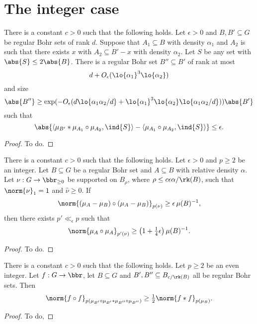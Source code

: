 \chapter{The integer case}

\begin{theorem}\label{th-ap-int}
There is a constant $c>0$ such that the following holds. Let $\epsilon>0$ and $B,B'\subseteq G$ be regular Bohr sets of rank $d$. Suppose that $A_1\subseteq B$ with density $\alpha_1$ and $A_2$ is such that there exists $x$ with $A_2\subseteq B'-x$ with density $\alpha_2$. Let $S$ be any set with $\abs{S}\leq 2\abs{B}$. There is a regular Bohr set $B''\subseteq B'$ of rank at most
\[d+O_\epsilon(\lo{\alpha_1}^3\lo{\alpha_2})\]
and size
\[\abs{B''}\geq \exp(-O_\epsilon(d\lo{\alpha_1\alpha_2/d}+\lo{\alpha_1}^3\lo{\alpha_2}\lo{\alpha_1\alpha_2/d}))\abs{B'}\]
such that
\[\abs{\langle \mu_{B'}\ast \mu_{A_1}\circ \mu_{A_2},\ind{S}\rangle-\langle \mu_{A_1}\circ \mu_{A_2},\ind{S}\rangle}\leq \epsilon.\]
\end{theorem}
\begin{proof}
To do.
\end{proof}

\begin{proposition}\label{Lp-orth}
There is a constant $c>0$ such that the following holds. Let $\epsilon >0$ and $p \geq 2$ be an integer. Let $B \subseteq G$ be a regular Bohr set and $A\subseteq B$ with relative density $\alpha$. Let $\nu : G \to \bbr_{\geq 0}$ be supported on $B_\rho$, where $\rho \leq c\epsilon\alpha/\rk(B)$, such that $\norm{\nu}_1=1$ and $\widehat{\nu}\geq 0$. If
    \[ \norm{(\mu_A-\mu_B) \circ (\mu_{A}-\mu_B)}_{p(\nu)} \geq \epsilon\, \mu(B)^{-1}, \]
    then there exists $p'\ll_\epsilon p$ such that
    \[ \norm{ \mu_{A}\circ \mu_{A}}_{p'(\nu)} \geq \left(1+\tfrac{1}{4}\epsilon\right) \mu(B)^{-1}. \]
\end{proposition}
\begin{proof}
To do. 
\end{proof}


\begin{proposition}\label{pos-def-measures}
There is a constant $c>0$ such that the following holds. Let $p \geq 2$ be an even integer. Let $f : G \to \bbr$, let $B \subseteq G$ and $B', B'' \subseteq B_{c/\rk(B)}$ all be regular Bohr sets. Then
\[ \norm{ f\circ f }_{p(\mu_{B'}\circ \mu_{B'}\ast \mu_{B''}\circ \mu_{B''})} \geq \tfrac{1}{2} \norm{f*f}_{p(\mu_B)}. \]
\end{proposition}
\begin{proof}
To do,
\end{proof}

